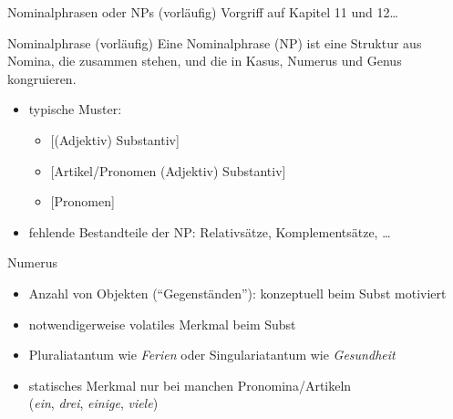 \begin{frame}
  {Nominalphrasen oder NPs (vorläufig)}
  \pause
  Vorgriff auf Kapitel 11 und 12\dots\\
  \pause
  \Halbzeile
  \begin{exe}
    \ex
    \begin{xlist}
      \pause
      \pause
    \end{xlist}
  \end{exe}
  \pause
  \begin{block}{Nominalphrase (vorläufig)}
    Eine Nominalphrase (NP) ist eine Struktur aus Nomina, die zusammen stehen, und die in Kasus, Numerus und Genus kongruieren.
  \end{block}
  \begin{itemize}[<+->]
    \item typische Muster:
      \begin{itemize}
        \item{[(Adjektiv) Substantiv]}
        \item{[Artikel\slash Pronomen (Adjektiv) Substantiv]}
        \item{[Pronomen]}
      \end{itemize}
    \item fehlende Bestandteile der NP: Relativsätze, Komplementsätze, \ldots
  \end{itemize}
\end{frame}

\begin{frame}
  {Numerus}
  \pause
  \begin{exe}
    \ex
    \begin{xlist}
      \pause
    \end{xlist}
    \pause
    \ex
    \begin{xlist}
      \pause
    \end{xlist}
  \end{exe}
  \pause
  \Halbzeile
  \begin{itemize}[<+->]
    \item \alert{Anzahl von Objekten ("`Gegenständen"')}: konzeptuell beim Subst motiviert
    \item notwendigerweise volatiles Merkmal beim Subst
    \item Pluraliatantum wie \textit{Ferien} oder Singulariatantum wie \textit{Gesundheit}
    \item statisches Merkmal nur bei manchen Pronomina\slash Artikeln\\
      (\textit{ein}, \textit{drei}, \textit{einige}, \textit{viele})
  \end{itemize}
\end{frame}

